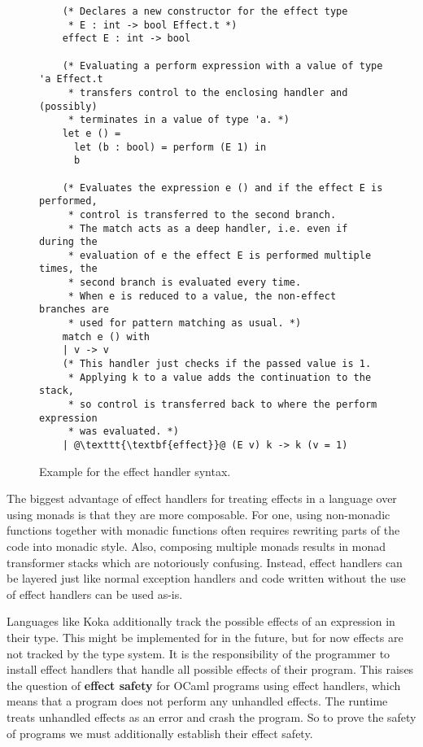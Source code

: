 \begin{figure}[ht]
    \begin{verbatim}
    (* Declares a new constructor for the effect type 
     * E : int -> bool Effect.t *)
    effect E : int -> bool

    (* Evaluating a perform expression with a value of type 'a Effect.t 
     * transfers control to the enclosing handler and (possibly)
     * terminates in a value of type 'a. *)
    let e () = 
      let (b : bool) = perform (E 1) in
      b

    (* Evaluates the expression e () and if the effect E is performed,
     * control is transferred to the second branch.
     * The match acts as a deep handler, i.e. even if during the 
     * evaluation of e the effect E is performed multiple times, the
     * second branch is evaluated every time.
     * When e is reduced to a value, the non-effect branches are 
     * used for pattern matching as usual. *)
    match e () with
    | v -> v
    (* This handler just checks if the passed value is 1.
     * Applying k to a value adds the continuation to the stack,
     * so control is transferred back to where the perform expression 
     * was evaluated. *)
    | @\texttt{\textbf{effect}}@ (E v) k -> k (v = 1)
\end{verbatim}
    \caption{Example for the effect handler syntax.}
    \label{fig:effect-example}
\end{figure}

The biggest advantage of effect handlers for treating effects in a language over using monads is that they are more composable.
For one, using non-monadic functions together with monadic functions often requires rewriting parts of the code into monadic style.
Also, composing multiple monads results in monad transformer stacks which are notoriously confusing.
Instead, effect handlers can be layered just like normal exception handlers and code written without the use of effect handlers can be used as-is.

Languages like Koka additionally track the possible effects of an expression in their type.
This might be implemented for \ocf{} in the future, but for now effects are not tracked by the type system.
It is the responsibility of the programmer to install effect handlers that handle all possible effects of their program.
This raises the question of \textbf{effect safety} for OCaml programs using effect handlers, which means that a program does not perform any unhandled effects.
The \ocf{} runtime treats unhandled effects as an error and crash the program.
So to prove the safety of \ocf{} programs we must additionally establish their effect safety.

